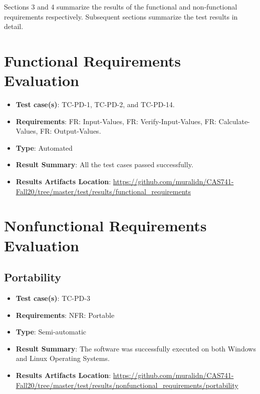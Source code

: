 \documentclass[12pt, titlepage]{article}
\begin{document}
Sections 3 and 4 summarize the results of the functional and non-functional
requirements respectively. Subsequent sections summarize the test results
in detail.

\section{Functional Requirements Evaluation}

\begin{itemize}

\item \textbf{Test case(s)}: TC-PD-1, TC-PD-2, and TC-PD-14.

\item \textbf{Requirements}: FR: Input-Values, FR: Verify-Input-Values,
FR: Calculate-Values, FR: Output-Values.

\item \textbf{Type}: Automated 

\item \textbf{Result Summary}: All the test cases passed successfully. 

\item \textbf{Results Artifacts Location}: \url{https://github.com/muralidn/CAS741-Fall20/tree/master/test/results/functional_requirements}

\end{itemize}

\section{Nonfunctional Requirements Evaluation}

\subsection{Portability}

\begin{itemize}

\item \textbf{Test case(s)}: TC-PD-3

\item \textbf{Requirements}: NFR: Portable

\item \textbf{Type}: Semi-automatic

\item \textbf{Result Summary}: The \progname{} software was successfully executed on both Windows and Linux 
Operating Systems.

 \item \textbf{Results Artifacts Location}: \url{https://github.com/muralidn/CAS741-Fall20/tree/master/test/results/nonfunctional_requirements/portability}
 
\end{itemize}
		
\end{document}
